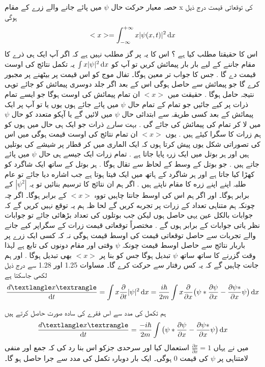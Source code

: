 \documentclass{book}
\begin{document}
حصہ معیار حرکت حال
\(\psi\)
میں پائے جانے والے زرے کے مقام 
x
کی توقعاتی قیمت درج ذیل ہوگی
\[<x>=\int_{-\infty}^{+\infty}x|\psi (x,t)|^{2}\dif{x}\]
اس کا حقیقتا مطلب کیا ہے ؟ اس کا یہ پر گز مطلب نہیں ہے کہ اگر آپ ایک ہی ذرے کا مقام جاننے کے لیے بار بار پیمائش کریں تو آپ کو
\(\int x|\psi|^{2}\dif{x}\)
یہ تکمل نتائج کی اوست قیمت دے گا . جس کا جواب تر معین ہوگا۔ تفال موج کو اس قیمت پر بیٹھنے پر مجبور کرے گا جو پیمائش سے حاصل ہوگی اس کے بعد اگر جلد دوسری پیمائش کو جائے توہی نتیجہ حامل ہوگا . حقیقت میں
\(<x>\)
ان تمام پیمائش کی اوست ہوگا جو ایسے تمام ذرات پر کیے جائیں جو تمام کے تمام حال
\(\psi\)
میں پائے جائے ہوں یوں یا تو آپ پر ایک پیمائش کے بعد کسی طریقہ سے ابتدائی حال
\(\psi\)
میں لائیں گے یا آپکو متعدد کو حال
\(\psi\)
میں لا کر تمام کی پیمائش کی جائے گی . بہت سارے ذرات جو ایک ہی حال میں ہوں کو ہم زرات کا سگرا کیئے ہیں . یوں
\(<x>\)
ان تمام نتائج کی اوست قیمت ہوگی  میں اس کی تصوراتی شکل یوں پیش کرتا ہوں کہ ایک الماری میں کر قطار پر شیشے کی بوتلیں ہیں اور ہر بوتل میں ایک زرہ پایا جاتا ہے . تمام زرات ایک جیسے ہی حال
\(\psi\)
میں پائے جاتے ہیں . جو بوتل کے وسط کے لحاظ سے تقال ہوگا . ہر بوتل کے ساتھ ایک شاگرد کو کھڑا کیا جاتا ہے اور ہر شاگرد کے ہاتھ میں ایک فیتا ہوتا ہے جب اشاره دیا جائے تو عام طلبہ اپنے اپنے زره کا مقام ناپتے ہیں . اگر ہم ان نتائج کا ترسیم بنائیں تو یہ
\(|\psi ^{2}|\)
کے برابر ہوگا۔ اور اگر ہم اس کی اوسط جانتا چاہیں تووہ
\(<x>\)
کے برابر ہوگا۔ اگر چہ چونکہ ہم متناہی تعداد کے زرات پر تجربه کریں گے لحا ظہ ہم یہ توقع نہیں کریں گے کہ جوابات بالکل عین یہی حاصل ہوں لیکن جب بوتلوں کی تعداد بڑھائی جائے تو جوابات نظر یاتی جوابات کے برابر ہوں گے . مختصراً توقعاتی قیمت زرات کے سگراپر کیے جانے والے تجربات سے حاصل توقعاتی قیمت کی اوسط قیمت ہوگی نہ کہ کسی ایک زرے پر باربار نتائج سے حاصل اوسط قیمت چونکہ
\(\psi\)
وقتی اور مقام دونوں کی تابع ہے لہذا وقت گزرنے کا ساتھ ساتھ
\(\psi\)
تبدیل ہوگا جس کو بنا پر
\(<x>\)
بھی تبدیل ہوگا . اور ہم جانت چاہیں گے کہ یہ کس رفتار سے حرکت کرے گا۔
مساوات 1.25 اور 1.28 سے درج ذیل لکھی جاسکتا ہے \\
\[\frac{d\textlangle x \textrangle}{\dif{t}}=\int x\frac{\partial}{\partial{t}}|\psi|^{2}\dif{x}=\frac{i\hbar}{2m}\int x\frac{\partial}{\partial{x}}\big (\psi *\frac{\partial{\psi}}{\partial{x}}-\frac{\partial{\psi *}}{\partial{x}}\psi \big)\dif{x}\]

ہم تکمل کی مدد سے اس فقرے کی ساده صورت حاصل کرتے ہیں \\
\[\frac{d\textlangle x \textrangle}{\dif{t}}=\frac{-i\hbar}{2m}\int\big (\psi *\frac{\partial{\psi}}{\partial{x}}-\frac{\partial{\psi *}}{\partial{x}}\psi \big)\dif{x}\]
میں نے یہاں
\(\frac{\partial{x}}{\partial{x}}=1\)
استعمال کیا اور سرحدی جزکو اس بنا رد کی کہ جمع اور منفی لامتناہی پر
\(\psi\)
کی قیمت 
0
ہوگی۔ ایک بار دوبارہ تکمل کی مدد سے جرا حاصل ہو گا۔
\end{document}
